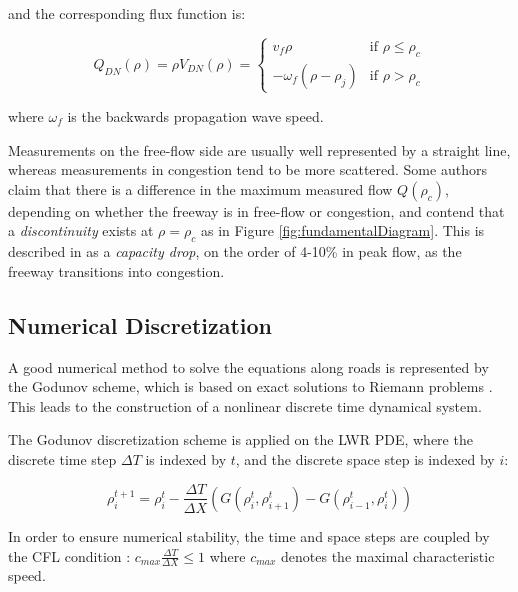 \documentclass[11pt]{article}
\numberwithin{equation}{section}
\numberwithin{figure}{section}
\numberwithin{table}{section}
\begin{document}
\noindent and the corresponding flux function is:

\begin{equation}\label{eq:dnFlux}
Q_{DN}(\rho) = \rho V_{DN}(\rho) = \begin{cases}
v_{f} \rho & \text{if } \rho \leq \rho_{c} \\
-\omega_{f} \left( \rho - \rho_{j} \right) & \text{if } \rho > \rho_{c}
\end{cases}
\end{equation}

\noindent where $\omega_{f}$ is the backwards propagation wave speed.

Measurements on the free-flow side are usually well represented by a straight line, whereas measurements in congestion tend to be more scattered. Some authors claim that there is a difference in the maximum measured flow $Q(\rho_{c})$, depending on whether the freeway is in free-flow or congestion, and contend that a \textit{discontinuity} exists at $\rho=\rho_{c}$ as in Figure \ref{fig:fundamentalDiagram}. This is described in \cite{Agyemang-Duah1991,Cassidy1999,Hall1991} as a \textit{capacity drop}, on the order of 4-10\% in peak flow, as the freeway transitions into congestion.

\subsection{Numerical Discretization}

A good numerical method to solve the equations along roads is represented by the Godunov scheme, which is based on exact solutions to Riemann problems \cite{Godlewski1996,Godunov1959}. This leads to the construction of a nonlinear discrete time dynamical system.

The Godunov discretization scheme is applied on the LWR PDE, where the discrete time step $\Delta T$ is indexed by $t$, and the discrete space step is indexed by $i$:

\begin{equation} \label{eq:rhoGodunov}
\rho^{t+1}_{i} = \rho^{t}_{i} - \frac{\Delta T}{\Delta X}\left(G(\rho^{t}_{i},\rho^{t}_{i+1})-G(\rho^{t}_{i-1},\rho^{t}_{i})\right)
\end{equation}

\noindent In order to ensure numerical stability, the time and space steps are coupled by the CFL condition \cite{LeVeque1992}: $c_{max}\frac{\Delta T}{\Delta X} \leq 1$ where $c_{max}$ denotes the maximal characteristic speed.
\end{document}
